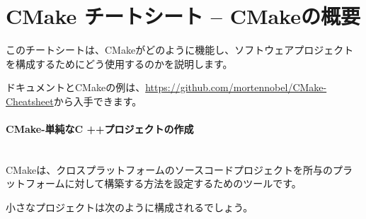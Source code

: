\documentclass[11pt,a4paper,landscape]{ltjsarticle}
\newcommand{\sectiontitle}[1]{\paragraph{#1} \ \\} %
\begin{document}


\section*{CMake チートシート -- CMakeの概要} %



\setlength{\columnsep}{1.5cm}
\begin{multicols}{2}



  
  このチートシートは、CMakeがどのように機能し、ソフトウェアプロジェクトを構成するためにどう使用するのかを説明します。
  
  ドキュメントとCMakeの例は、\url{https://github.com/mortennobel/CMake-Cheatsheet}から入手できます。
 

  \sectiontitle{CMake-単純なC ++プロジェクトの作成}
  

CMakeは、クロスプラットフォームのソースコードプロジェクトを所与のプラットフォームに対して構築する方法を設定するためのツールです。

小さなプロジェクトは次のように構成されるでしょう。

\vspace{\baselineskip} %

\noindent{}


\end{multicols}
\end{document}
